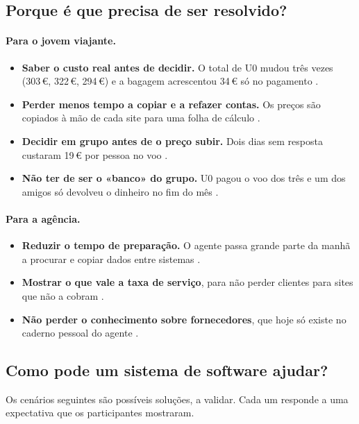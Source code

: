 \subsection{Porque é que precisa de ser resolvido?}

\paragraph{Para o jovem viajante.}
\begin{itemize}
  \item \textbf{Saber o custo real antes de decidir.} O total de U0 mudou três vezes (303\,€, 322\,€, 294\,€) e a bagagem acrescentou 34\,€ só no pagamento .
  \item \textbf{Perder menos tempo a copiar e a refazer contas.} Os preços são copiados à mão de cada site para uma folha de cálculo .
  \item \textbf{Decidir em grupo antes de o preço subir.} Dois dias sem resposta custaram 19\,€ por pessoa no voo .
  \item \textbf{Não ter de ser o «banco» do grupo.} U0 pagou o voo dos três e um dos amigos só devolveu o dinheiro no fim do mês .
\end{itemize}

\paragraph{Para a agência.}
\begin{itemize}
  \item \textbf{Reduzir o tempo de preparação.} O agente passa grande parte da manhã a procurar e copiar dados entre sistemas .
  \item \textbf{Mostrar o que vale a taxa de serviço}, para não perder clientes para sites que não a cobram .
  \item \textbf{Não perder o conhecimento sobre fornecedores}, que hoje só existe no caderno pessoal do agente .
\end{itemize}

\subsection{Como pode um sistema de software ajudar?}

Os cenários seguintes são possíveis soluções, a validar. Cada um responde a uma expectativa que os participantes mostraram.

